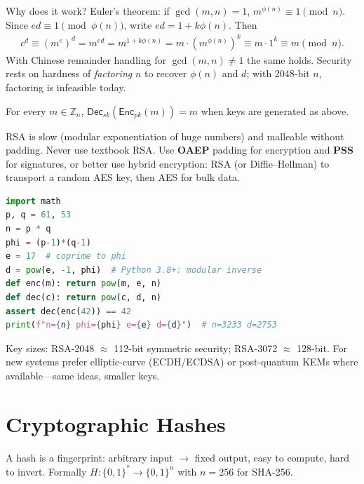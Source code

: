 Why does it work? Euler's theorem: if $\gcd(m,n)=1$, $m^{\phi(n)}\equiv1\pmod n$. Since $ed\equiv1\pmod{\phi(n)}$, write $ed=1+k\phi(n)$. Then
\begin{align}
c^{d} \equiv (m^{e})^{d} = m^{ed} = m^{1+k\phi(n)} = m\cdot(m^{\phi(n)})^{k} \equiv m\cdot1^{k} \equiv m \pmod n.
\end{align}
With Chinese remainder handling for $\gcd(m,n)\neq1$ the same holds. Security rests on hardness of \emph{factoring} $n$ to recover $\phi(n)$ and $d$; with 2048-bit $n$, factoring is infeasible today.

\begin{theorem}
For every $m\in\mathbb{Z}_n$, $\mathsf{Dec}_{sk}(\mathsf{Enc}_{pk}(m))=m$ when keys are generated as above.
\end{theorem}

RSA is slow (modular exponentiation of huge numbers) and malleable without padding. Never use textbook RSA. Use \textbf{OAEP} padding for encryption and \textbf{PSS} for signatures, or better use hybrid encryption: RSA (or Diffie--Hellman) to transport a random AES key, then AES for bulk data.

\begin{lstlisting}[language=Python,caption={RSA toy (small primes) --- do not use for real secrecy.},label={lst:rsa}]
import math
p, q = 61, 53
n = p * q
phi = (p-1)*(q-1)
e = 17  # coprime to phi
d = pow(e, -1, phi)  # Python 3.8+: modular inverse
def enc(m): return pow(m, e, n)
def dec(c): return pow(c, d, n)
assert dec(enc(42)) == 42
print(f"n={n} phi={phi} e={e} d={d}")  # n=3233 d=2753
\end{lstlisting}

Key sizes: RSA-2048 $\approx$ 112-bit symmetric security; RSA-3072 $\approx$ 128-bit. For new systems prefer elliptic-curve (ECDH/ECDSA) or post-quantum KEMs where available---same ideas, smaller keys.

\section{Cryptographic Hashes}
\label{sec:hash}
A hash is a fingerprint: arbitrary input $\to$ fixed output, easy to compute, hard to invert. Formally $H:\{0,1\}^*\to\{0,1\}^n$ with $n=256$ for SHA-256.

